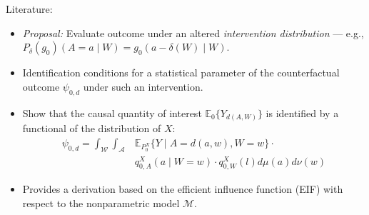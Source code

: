 \documentclass{beamer}
\newcommand{\E}{\mathbb{E}}
\begin{document}

\begin{frame}[c]{Literature: \cite{diaz2012population}}

\begin{center}
\begin{itemize}
  \itemsep10pt
  \item \textit{Proposal:} Evaluate outcome under an altered
    \textit{intervention distribution} --- e.g.,
    $P_{\delta}(g_0)(A = a \mid W) = g_0(a - \delta(W) \mid W)$.
  \item Identification conditions for a statistical parameter of the
    counterfactual outcome $\psi_{0,d}$ under such an intervention.
  \item Show that the causal quantity of interest $\E_0 \{Y_{d(A, W)}\}$ is
    identified by a functional of the distribution of $X$:
    \begin{align*}\label{eqn:identification2012}
      \psi_{0,d} = \int_{\mathcal{W}} \int_{\mathcal{A}} &\E_{P_0^X} \{Y \mid
        A = d(a, w), W = w\} \cdot \\ &q_{0, A}^X(a \mid W = w) \cdot
        q_{0, W}^X(l) d\mu(a)d\nu(w)
    \end{align*}
  \item Provides a derivation based on the efficient influence function (EIF)
    with respect to the nonparametric model $\mathcal{M}$.
\end{itemize}
\end{center}


\end{frame}
\end{document}
